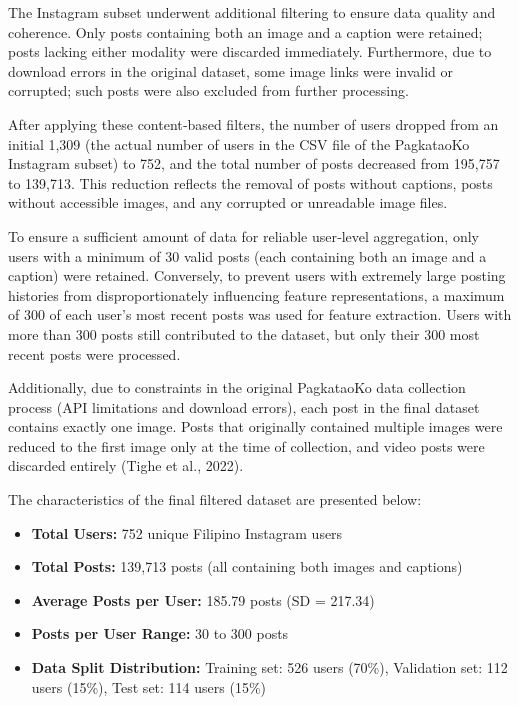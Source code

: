 The Instagram subset underwent additional filtering to ensure data quality and coherence. Only posts containing both an image and a caption were retained; posts lacking either modality were discarded immediately. Furthermore, due to download errors in the original dataset, some image links were invalid or corrupted; such posts were also excluded from further processing.

After applying these content‑based filters, the number of users dropped from an initial 1,309 (the actual number of users in the CSV file of the PagkataoKo Instagram subset) to 752, and the total number of posts decreased from 195,757 to 139,713. This reduction reflects the removal of posts without captions, posts without accessible images, and any corrupted or unreadable image files.

To ensure a sufficient amount of data for reliable user‑level aggregation, only users with a minimum of 30 valid posts (each containing both an image and a caption) were retained. Conversely, to prevent users with extremely large posting histories from disproportionately influencing feature representations, a maximum of 300 of each user’s most recent posts was used for feature extraction. Users with more than 300 posts still contributed to the dataset, but only their 300 most recent posts were processed. 

Additionally, due to constraints in the original PagkataoKo data collection process (API limitations and download errors), each post in the final dataset contains exactly one image. Posts that originally contained multiple images were reduced to the first image only at the time of collection, and video posts were discarded entirely (Tighe et al., 2022).

The characteristics of the final filtered dataset are presented below:

\begin{itemize}
	\item \textbf{Total Users:} 752 unique Filipino Instagram users
	\item \textbf{Total Posts:} 139,713 posts (all containing both images and captions)
	\item \textbf{Average Posts per User:} 185.79 posts (SD = 217.34)
	\item \textbf{Posts per User Range:} 30 to 300 posts
	\item \textbf{Data Split Distribution:} Training set: 526 users (70\%), Validation set: 112 users (15\%), Test set: 114 users (15\%)
\end{itemize}

